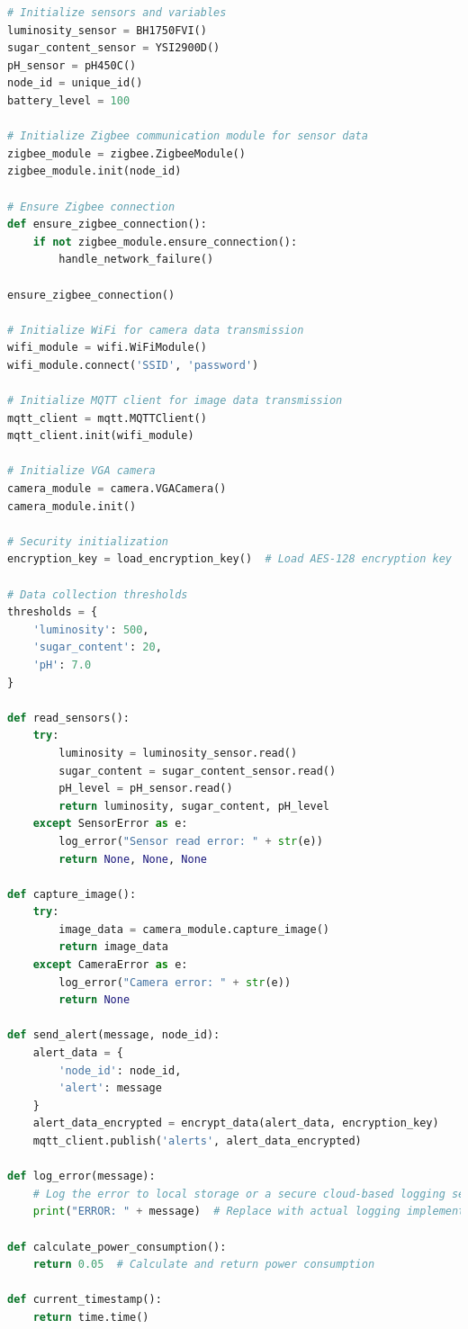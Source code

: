 \documentclass{article}
\begin{document}
\begin{enumerate}
\begin{lstlisting}[language=Python]
# Initialize sensors and variables
luminosity_sensor = BH1750FVI()
sugar_content_sensor = YSI2900D()
pH_sensor = pH450C()
node_id = unique_id()
battery_level = 100

# Initialize Zigbee communication module for sensor data
zigbee_module = zigbee.ZigbeeModule()
zigbee_module.init(node_id)

# Ensure Zigbee connection
def ensure_zigbee_connection():
    if not zigbee_module.ensure_connection():
        handle_network_failure()

ensure_zigbee_connection()

# Initialize WiFi for camera data transmission
wifi_module = wifi.WiFiModule()
wifi_module.connect('SSID', 'password')

# Initialize MQTT client for image data transmission
mqtt_client = mqtt.MQTTClient()
mqtt_client.init(wifi_module)

# Initialize VGA camera
camera_module = camera.VGACamera()
camera_module.init()

# Security initialization
encryption_key = load_encryption_key()  # Load AES-128 encryption key

# Data collection thresholds
thresholds = {
    'luminosity': 500,
    'sugar_content': 20,
    'pH': 7.0
}

def read_sensors():
    try:
        luminosity = luminosity_sensor.read()
        sugar_content = sugar_content_sensor.read()
        pH_level = pH_sensor.read()
        return luminosity, sugar_content, pH_level
    except SensorError as e:
        log_error("Sensor read error: " + str(e))
        return None, None, None

def capture_image():
    try:
        image_data = camera_module.capture_image()
        return image_data
    except CameraError as e:
        log_error("Camera error: " + str(e))
        return None

def send_alert(message, node_id):
    alert_data = {
        'node_id': node_id,
        'alert': message
    }
    alert_data_encrypted = encrypt_data(alert_data, encryption_key)
    mqtt_client.publish('alerts', alert_data_encrypted)

def log_error(message):
    # Log the error to local storage or a secure cloud-based logging service
    print("ERROR: " + message)  # Replace with actual logging implementation

def calculate_power_consumption():
    return 0.05  # Calculate and return power consumption

def current_timestamp():
    return time.time()


\end{lstlisting}
\end{enumerate}
\end{document}

